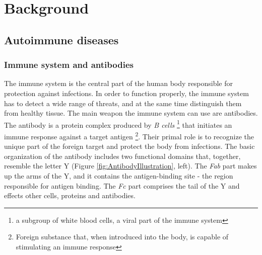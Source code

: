 
\chapter{Background} 

\label{Chapter2} %



\section{Autoimmune diseases}

\subsection{Immune system and antibodies }

The immune system is the central part of the human body responsible for protection against infections. In order to function properly, the immune system has to detect a wide range of threats, and at the same time distinguish them from  healthy tissue. The main weapon the immune system can use are antibodies.   \\

The antibody is a protein complex produced by \textit{B cells} \footnote{ a subgroup of white blood cells, a viral part of the immune system} that initiates an immune response against a target antigen \footnote{Foreign substance that, when introduced into the body, is capable of stimulating an immune response}. Their primal role is to recognize the unique part of the foreign target and  protect the body from infections. The basic organization of the antibody includes two functional domains that, together, resemble the letter Y (Figure \ref{fig:AntibodyIllustration}, left). The \textit{Fab}  part makes up the arms of the Y, and it contains the antigen-binding site - the region responsible for antigen binding. The \textit{Fc} part comprises the tail of the Y and effects other cells, proteins and antibodies.  \\

